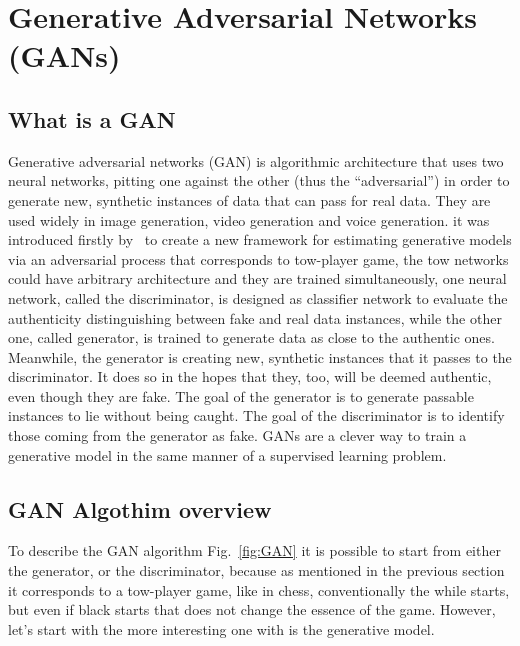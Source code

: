 

\pagestyle{fancy} 
\chapter{Generative Adversarial Networks (GANs)}
\label{cha:4}
\vspace{1cm}
\section{What is a GAN}

Generative adversarial networks (GAN) is algorithmic architecture that uses two neural networks, pitting one against the other (thus the “adversarial”) in order to generate new, synthetic instances of data that can pass for real data. They are used widely in image generation, video generation and voice generation. it was introduced firstly by~\cite{goodfellow2014generative} to create a new framework for estimating generative models via an adversarial process that corresponds to tow-player game,
the tow networks could have arbitrary architecture and they are trained simultaneously, one neural network, called the discriminator, is designed as classifier network to evaluate the authenticity  distinguishing between fake and real data instances, while the other one, called generator, is trained to generate data as close to the authentic ones. Meanwhile, the generator is creating new, synthetic instances that it passes to the discriminator. It does so in the hopes that they, too, will be deemed authentic, even though they are fake. The goal of the generator is to generate passable instances to lie without being caught. The goal of the discriminator is to identify those coming from the generator as fake. GANs are a clever way to train a generative model in the same manner of a supervised learning problem.

\section{GAN Algothim overview}
\label{sec:GAN_algorithm}
To describe the GAN algorithm Fig.~\ref{fig:GAN} it is possible to start from either the generator, or the discriminator, because as mentioned in the previous section it corresponds to a tow-player game, like in chess, conventionally the while starts, but even if black starts that does not change the essence of the game. However, let's start with the more interesting one with is the generative model.\\

